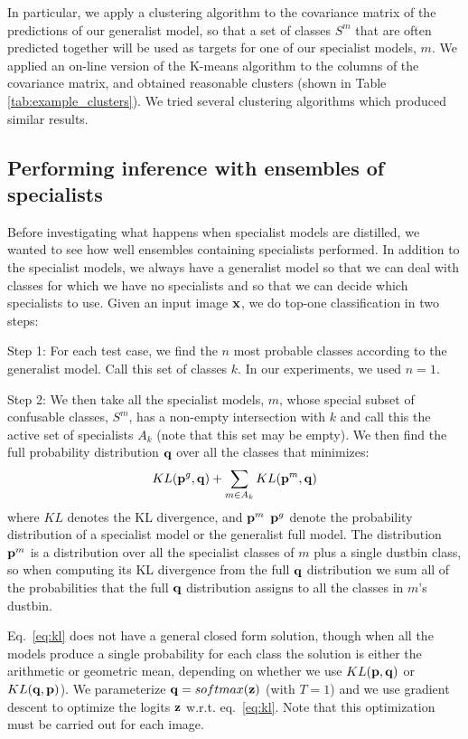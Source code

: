In particular, we apply a clustering algorithm to the covariance matrix of the predictions of our generalist model, so that
a set of classes $S^m$ that are often predicted together will be used as targets for one of our specialist models, $m$. We applied an on-line
version of the K-means algorithm to the columns of the covariance matrix, and obtained reasonable clusters (shown in
Table \ref{tab:example_clusters}). We tried several clustering algorithms which produced similar results.

\subsection{Performing inference with ensembles of specialists}

Before investigating what happens when specialist models are
distilled, we wanted to see how well ensembles containing specialists
performed. In addition to the specialist models, we always have a
generalist model so that we can deal with classes for which we
have no specialists and so that we can decide which specialists to
use. Given an input image $\mathbf{x}$, we do top-one classification in two steps:

Step 1: For each test case, we find
  the $n$ most probable classes according to the generalist model. Call this set of classes $k$. In our
  experiments, we used $n=1$.

Step 2: We then take all the specialist models, $m$, whose special
subset of confusable classes,
  $S^m$, has a non-empty intersection with $k$ and call this the active
  set of specialists $A_k$ (note that this set may be empty). We then
  find the full probability distribution $\mathbf{q}$ over all the classes
  that minimizes:
\begin{equation}
KL (\mathbf{p}^g, \mathbf{q}) + \sum_{m \in A_k} KL (\mathbf{p}^m , \mathbf{q})  
\label{eq:kl}
\end{equation}
where $KL$ denotes the KL divergence, and $\mathbf{p}^m$ $\mathbf{p}^g$ denote the
probability distribution of a specialist model or the generalist full
model. The distribution $\mathbf{p}^m$ is a distribution over all the
specialist classes of $m$ plus a single dustbin class, so when
computing its KL divergence from the full $\mathbf{q}$ distribution we sum
all of the probabilities that the full $\mathbf{q}$ distribution assigns to
all the classes in $m$'s dustbin.


Eq.~\ref{eq:kl} does not have a general closed form solution, though when all the models produce a single probability for
each class the solution is either the arithmetic or geometric mean, depending on whether we use $KL(\mathbf{p},\mathbf{q})$
or $KL(\mathbf{q},\mathbf{p})$). We parameterize $\mathbf{q} =
softmax(\mathbf{z})$ (with $T=1$) and we use gradient descent to optimize the logits $\mathbf{z}$ w.r.t. eq.~\ref{eq:kl}. Note that this
optimization must be carried out for each image.  

